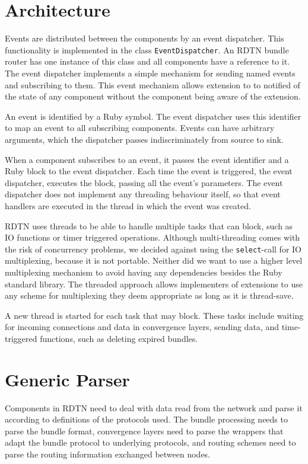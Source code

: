 \documentclass{article}
\begin{document}
\section{Architecture}\label{sec.arch}

Events are distributed between the components by an event dispatcher. This
functionality is implemented in the class {\tt EventDispatcher}. An RDTN bundle
router has one instance of this class and all components have a reference to it.
The event dispatcher implements a simple mechanism for sending named events and
subscribing to them.  This event mechanism allows extension to to notified of
the state of any component without the component being aware of the extension.

An event is identified by a Ruby symbol. The event dispatcher uses this
identifier to map an event to all subscribing components. Events can have
arbitrary arguments, which the dispatcher passes indiscriminately from source to
sink.

When a component subscribes to an event, it passes the event identifier and a
Ruby block to the event dispatcher. Each time the event is triggered, the event
dispatcher, executes the block, passing all the event's parameters.  The event
dispatcher does not implement any threading behaviour itself, so that event
handlers are executed in the thread in which the event was created.

RDTN uses threads to be able to handle multiple tasks that can block, such as IO
functions or timer triggered operations. Although multi-threading comes with the
risk of concurrency problems, we decided against using the {\tt select}-call for
IO multiplexing, because it is not portable. Neither did we want to use a higher
level multiplexing mechanism to avoid having any dependencies besides the Ruby
standard library. The threaded approach allows implementers of extensions to use
any scheme for multiplexing they deem appropriate as long as it is thread-save.

A new thread is started for each task that may block. These tasks include
waiting for incoming connections and data in convergence layers, sending data,
and time-triggered functions, such as deleting expired bundles.

\section{Generic Parser}\label{sec.genparser}

Components in RDTN need to deal with data read from the network and parse it
according to definitions of the protocols used. The bundle processing needs to
parse the bundle format, convergence layers need to parse the wrappers that
adapt the bundle protocol to underlying protocols, and routing schemes need to
parse the routing information exchanged between nodes.
\end{document}
